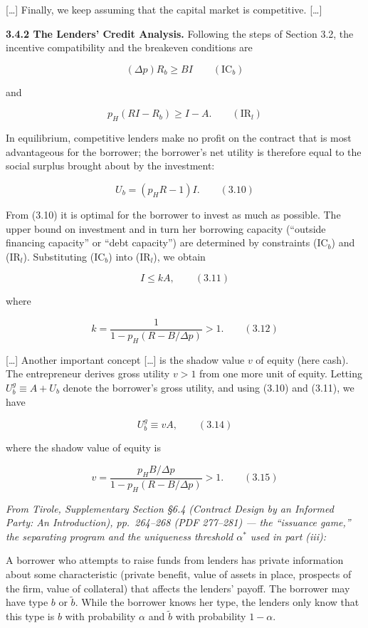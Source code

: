 \documentclass[11pt,a4paper]{article}
\begin{document}
{[}\ldots{]} Finally, we keep assuming that the capital market is competitive. {[}\ldots{]}

\textbf{3.4.2 The Lenders' Credit Analysis.} Following the steps of Section 3.2, the incentive
compatibility and the breakeven conditions are

\[(\Delta p) R_b \geqslant BI \qquad (\text{IC}_b)\]

and

\[p_H(RI - R_b) \geqslant I - A. \qquad (\text{IR}_l)\]

In equilibrium, competitive lenders make no profit on the contract that is most advantageous for the
borrower; the borrower's net utility is therefore equal to the social surplus brought about by the
investment:

\[U_b = (p_H R - 1)I. \qquad (3.10)\]

From (3.10) it is optimal for the borrower to invest as much as possible. The upper bound on
investment and in turn her borrowing capacity (``outside financing capacity'' or ``debt capacity'')
are determined by constraints (IC\(_b\)) and (IR\(_l\)). Substituting (IC\(_b\)) into (IR\(_l\)), we
obtain

\[I \leqslant kA, \qquad (3.11)\]

where

\[k = \frac{1}{1 - p_H(R - B/\Delta p)} > 1. \qquad (3.12)\]

{[}\ldots{]} Another important concept {[}\ldots{]} is the shadow value \(v\) of equity (here cash).
The entrepreneur derives gross utility \(v > 1\) from one more unit of equity. Letting
\(U_b^g \equiv A + U_b\) denote the borrower's gross utility, and using (3.10) and (3.11), we have

\[U_b^g \equiv vA, \qquad (3.14)\]

where the shadow value of equity is

\[v = \frac{p_H B/\Delta p}{1 - p_H(R - B/\Delta p)} > 1. \qquad (3.15)\]

\emph{From Tirole, Supplementary Section §6.4 (Contract Design by an Informed Party: An
Introduction), pp.~264--268 (PDF 277--281) --- the ``issuance game,'' the separating program and the
uniqueness threshold \(\alpha^*\) used in part (iii):}

A borrower who attempts to raise funds from lenders has private information about some
characteristic (private benefit, value of assets in place, prospects of the firm, value of
collateral) that affects the lenders' payoff. The borrower may have type \(b\) or \(\tilde{b}\).
While the borrower knows her type, the lenders only know that this type is \(b\) with probability
\(\alpha\) and \(\tilde{b}\) with probability \(1 - \alpha\).
\end{document}
